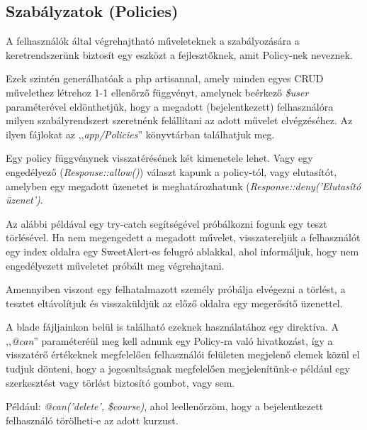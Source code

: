 \documentclass[
]{thesis-ekf}
\theoremstyle{definition}
\theoremstyle{remark}
\begin{document}
                \subsection{Szabályzatok (Policies)}
                A felhasználók által végrehajtható műveleteknek a szabályozására a keretrendszerünk biztosít egy eszközt a fejlesztőknek, amit Policy-nek\cite{Laravel-AuthPolicies} neveznek. 
                
                Ezek szintén generálhatóak a php artisannal, amely minden egyes CRUD művelethez létrehoz 1-1 ellenőrző függvényt, amelynek beérkező \emph{\$user} paraméterével eldönthetjük, hogy a megadott (bejelentkezett) felhasználóra milyen szabályrendszert szeretnénk felállítani az adott művelet elvégzéséhez. Az ilyen fájlokat az ,,\emph{app/Policies}'' könyvtárban találhatjuk meg.
                
                Egy policy függvénynek visszatérésének két kimenetele lehet. Vagy egy engedélyező (\emph{Response::allow()}) választ kapunk a policy-tól, vagy elutasítót, amelyben egy megadott üzenetet is meghatározhatunk (\emph{Response::deny('Elutasító üzenet')}.

                Az alábbi példával egy try-catch segítségével próbálkozni fogunk egy teszt törlésével. Ha nem megengedett a megadott művelet, visszatereljük a felhasználót egy index oldalra egy SweetAlert-es felugró ablakkal, ahol informáljuk, hogy nem engedélyezett műveletet próbált meg végrehajtani. 

                Amennyiben viszont egy felhatalmazott személy próbálja elvégezni a törlést, a tesztet eltávolítjuk és visszaküldjük az előző oldalra egy megerősítő üzenettel.

				
                

                A blade fájljainkon belül is található ezeknek használatához egy direktíva. A ,,\emph{@can}'' paraméteréül meg kell adnunk egy Policy-ra való hivatkozást, így a visszatérő értékeknek megfelelően felhasználói felületen megjelenő elemek közül el tudjuk dönteni, hogy a jogosultságnak megfelelően megjelenítünk-e például egy szerkesztést vagy törlést biztosító gombot, vagy sem.
                
                Például: \emph{@can('delete', \$course)}, ahol leellenőrzöm, hogy a bejelentkezett felhasználó törölheti-e az adott kurzust.
\end{document}
